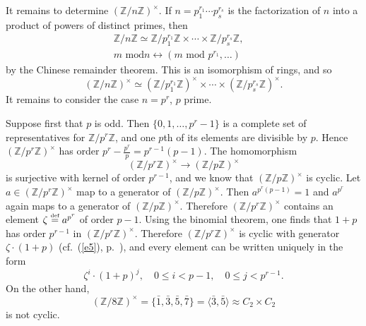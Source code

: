 \documentclass[a4paper,11pt,final,openany]{memoir}%
\theoremstyle{nonumberplain}
\begin{document}
It remains to determine $(\mathbb{Z}/n\mathbb{Z})^{\times}$. If $n=p_{1}%
^{r_{1}}\cdots p_{s}^{r_{s}}$ is the factorization of $n$ into a product of
powers of distinct primes, then%
\begin{align*}
\mathbb{Z}/n\mathbb{Z}\simeq\mathbb{Z}/p_{1}^{r_{1}}\mathbb{Z}\times
\cdots\times\mathbb{Z}/p_{s}^{r_{s}}\mathbb{Z},\quad\\
 m\text{ mod
}n\leftrightarrow(m\text{ mod }p^{r_{1}},\ldots)
\end{align*}
by the Chinese remainder theorem. This is an isomorphism of rings, and so%
\[
(\mathbb{Z}/n\mathbb{Z})^{\times}\simeq(\mathbb{Z}/p_{1}^{r_{1}}%
\mathbb{Z})^{\times}\times\cdots\times(\mathbb{Z}/p_{s}^{r_{s}}\mathbb{Z}%
)^{\times}.
\]
It remains to consider the case $n=p^{r}$, $p$ prime.

Suppose first that $p$ is odd. Then $\{0,1,\ldots,p^{r}-1\}$ is a complete set
of representatives for $\mathbb{Z}/p^{r}\mathbb{Z}$, and one $p$th of its
elements are divisible by $p$. Hence $(\mathbb{Z}/p^{r}\mathbb{Z})^{\times}$
has order $p^{r}-\frac{p^{r}}{p}=p^{r-1}(p-1)$. The homomorphism%
\[
(\mathbb{Z}/p^{r}\mathbb{Z})^{\times}\rightarrow(\mathbb{Z}/p\mathbb{Z}%
)^{\times}%
\]
is surjective with kernel of order $p^{r-1}$, and we know that $(\mathbb{Z}%
/p\mathbb{Z})^{\times}$ is cyclic. Let $a\in(\mathbb{Z}/p^{r}\mathbb{Z}%
)^{\times}$ map to a generator of $(\mathbb{Z}{}/p\mathbb{Z}{})^{\times}$.
Then $a^{p^{r}(p-1)}=1$ and $a^{p^{r}}$ again maps to a generator of
$(\mathbb{Z}{}/p\mathbb{Z}{})^{\times}$. Therefore $(\mathbb{Z}{}%
/p^{r}\mathbb{Z}{})^{\times}$ contains an element $\zeta
\overset{\textup{{\tiny def}}}{=}a^{p^{r}}$ of order $p-1$. Using the binomial
theorem, one finds that $1+p$ has order $p^{r-1}$ in $(\mathbb{Z}%
/p^{r}\mathbb{Z})^{\times}$. Therefore $(\mathbb{Z}/p^{r}\mathbb{Z})^{\times}$
is cyclic with generator $\zeta\cdot(1+p)$ (cf.\ (\ref{e5}), p.~\pageref{e5}),
and every element can be written uniquely in the form
\[
\zeta^{i}\cdot(1+p)^{j},\quad0\leq i<p-1,\quad0\leq j<p^{r-1}.
\]
On the other hand,
\[
(\mathbb{Z}/8\mathbb{Z})^{\times}=\{\bar{1},\bar{3},\bar{5},\bar{7}%
\}=\langle\bar{3},\bar{5}\rangle\approx C_{2}\times C_{2}%
\]
is not cyclic.
\end{document}
